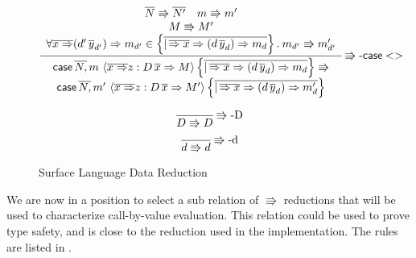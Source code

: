 \begin{figure}
\[
\frac{\begin{array}{c}
\overline{N}\Rrightarrow\overline{N'}\quad m\Rrightarrow m'\\
M\Rrightarrow M'\\
\forall\overline{x\Rightarrow}(d'\,\overline{y}_{d'})\Rightarrow m_{d'}\in\left\{ \overline{|\,\overline{\Rightarrow x}\Rightarrow(d\,\overline{y}_{d})\Rightarrow m_{d}}\right\} .\:m_{d'}\Rrightarrow m'_{d'}
\end{array}}{\begin{array}{c}
\mathsf{case}\,\overline{N,}\,m\,\left\langle \overline{x\Rightarrow}z:D\,\overline{x}\Rightarrow M\right\rangle \left\{ \overline{|\,\overline{\Rightarrow x}\Rightarrow(d\,\overline{y}_{d})\Rightarrow m_{d}}\right\} \Rrightarrow\\
\mathsf{case}\,\overline{N,}\,m'\,\left\langle \overline{x\Rightarrow}z:D\,\overline{x}\Rightarrow M'\right\rangle \left\{ \overline{|\,\overline{\Rightarrow x}\Rightarrow(d\,\overline{y}_{d})\Rightarrow m'_{d}}\right\} 
\end{array}
}\operatorname{\Rrightarrow-\mathsf{case}{}<>} 
\]

\[
\frac{\,}{D\Rrightarrow D}\operatorname{\Rrightarrow-D}
\]
\[
\frac{\,}{d\Rrightarrow d}\operatorname{\Rrightarrow-d}
\]
\caption{Surface Language Data Reduction}
\label{fig:surface-data-red}
\end{figure}

We are now in a position to select a sub relation of $\Rrightarrow$ reductions that will be used to characterize call-by-value evaluation.
This relation could be used to prove type safety, and is close to the reduction used in the implementation.
The rules are listed in .


